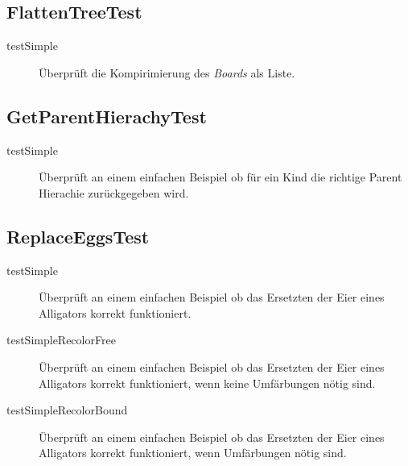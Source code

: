 \subsection{FlattenTreeTest}
	\begin{description}
		\item[testSimple] Überprüft die Kompirimierung des \emph{Boards} als Liste.
	\end{description}
\subsection{GetParentHierachyTest}
	\begin{description}
		\item[testSimple] Überprüft an einem einfachen Beispiel ob für ein Kind die richtige Parent Hierachie zurückgegeben 
			wird.
	\end{description}
\subsection{ReplaceEggsTest}
	\begin{description}
		\item[testSimple] Überprüft an einem einfachen Beispiel ob das Ersetzten der Eier eines Alligators korrekt 
			funktioniert.
		\item[testSimpleRecolorFree]Überprüft an einem einfachen Beispiel ob das Ersetzten der Eier eines Alligators korrekt 
			funktioniert, wenn keine Umfärbungen nötig sind.
		\item[testSimpleRecolorBound]Überprüft an einem einfachen Beispiel ob das Ersetzten der Eier eines Alligators korrekt 
			funktioniert, wenn Umfärbungen nötig sind.
	\end{description}
